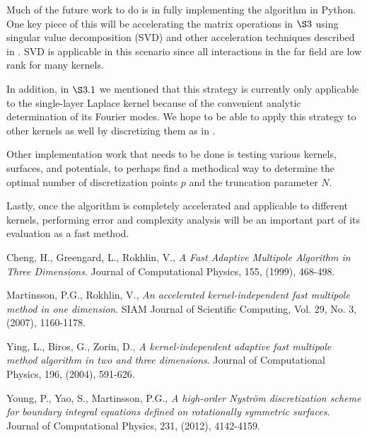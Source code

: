 \documentclass[12pt,letterpaper]{article}
\begin{document}
Much of the future work to do is in fully implementing the algorithm in Python. One key piece of this will be accelerating the matrix operations in $\S3$ using singular value decomposition (SVD) and other acceleration techniques described in \cite{MV}. SVD is applicable in this scenario since all interactions in the far field are low rank for many kernels.

In addition, in $\S3.1$ we mentioned that this strategy is currently only applicable to the single-layer Laplace kernel because of the convenient analytic determination of its Fourier modes. We hope to be able to apply this strategy to other kernels as well by discretizing them as in \cite{YYM}.

Other implementation work that needs to be done is testing various kernels, surfaces, and potentials, to perhaps find a methodical way to determine the optimal number of discretization points $p$ and the truncation parameter $N$.

Lastly, once the algorithm is completely accelerated and applicable to different kernels, performing error and complexity analysis will be an important part of its evaluation as a fast method.

\begin{thebibliography}{99}

 Cheng, H., Greengard, L., Rokhlin, V., \emph{A Fast Adaptive Multipole Algorithm in Three Dimensions}. Journal of Computational Physics, 155, (1999), 468-498.


 Martinsson, P.G., Rokhlin, V., \emph{An accelerated kernel-independent fast multipole method in one dimension}. SIAM Journal of Scientific Computing, Vol. 29, No. 3, (2007), 1160-1178.

 Ying, L., Biros, G., Zorin, D., \emph{A kernel-independent adaptive fast multipole method algorithm in two and three dimensions}. Journal of Computational Physics, 196, (2004), 591-626.

 Young, P., Yao, S., Martinsson, P.G., \emph{A high-order Nystr{\"o}m discretization scheme for boundary integral equations defined on rotationally symmetric surfaces}. Journal of Computational Physics, 231, (2012), 4142-4159.

\end{thebibliography}
\end{document}
